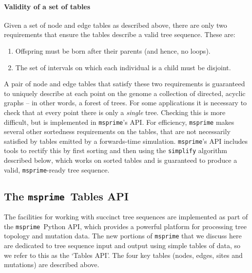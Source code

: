 \documentclass{article}
\newcommand{\msprime}{\texttt{msprime}}
\begin{document}
\paragraph{Validity of a set of tables}
Given a set of node and edge tables as described above,
there are only two requirements that ensure the tables
describe a valid tree sequence.
These are:
\begin{enumerate}
    \item Offspring must be born after their parents (and hence, no loops).
    \item The set of intervals on which each individual is a child must be disjoint.
\end{enumerate}
A pair of node and edge tables that satisfy these two requirements
is guaranteed to uniquely describe at each point on the genome
a collection of directed, acyclic graphs -- in other words, a forest of trees.
For some applications it is necessary to check that at every point
there is only a \emph{single} tree.
Checking this is more difficult, but is implemented in \msprime{}'s API.
For efficiency, \msprime{} makes several other sortedness requirements on the tables,
that are not necessarily satisfied by tables emitted by a forwards-time simulation.
\msprime{}'s API includes tools to rectify this by first sorting %
and then using the \texttt{simplify} algorithm described below, which works on sorted tables
and is guaranteed to produce a valid, \msprime{}-ready tree sequence.



\subsection*{The \msprime\ Tables API}

The facilities for working with succinct tree sequences are implemented as part
of the \msprime\ Python API, which provides a powerful platform for processing
tree topology and mutation data. The new portions of \msprime{} that we discuss
here are dedicated to tree sequence input and output using simple tables of
data, so we refer to this as the `Tables API'. The four key tables (nodes,
edges, sites and mutations) are described above.
\end{document}
